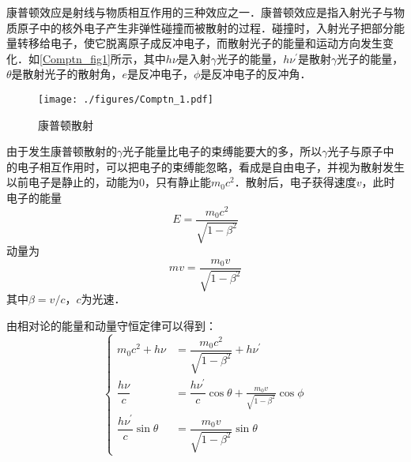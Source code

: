 
康普顿效应是射线与物质相互作用的三种效应之一．康普顿效应是指入射光子与物质原子中的核外电子产生非弹性碰撞而被散射的过程．碰撞时，入射光子把部分能量转移给电子，使它脱离原子成反冲电子，而散射光子的能量和运动方向发生变化．如\autoref{Comptn_fig1}所示，其中$h\nu$是入射$\gamma$光子的能量，$h\nu^\prime$是散射$\gamma$光子的能量，$\theta$是散射光子的散射角，$e$是反冲电子，$\phi$是反冲电子的反冲角．
\begin{figure}[ht]
\centering
\texttt{[image: ./figures/Comptn\_1.pdf]}
\caption{康普顿散射} \label{Comptn_fig1}
\end{figure}
由于发生康普顿散射的$\gamma$光子能量比电子的束缚能要大的多，所以$\gamma$光子与原子中的电子相互作用时，可以把电子的束缚能忽略，看成是自由电子，并视为散射发生以前电子是静止的，动能为$0$，只有静止能$m_0c^2$．散射后，电子获得速度$v$，此时电子的能量
\begin{equation}
E=\frac{m_{0} c^{2}}{\sqrt{1-\beta^{2}}}
\end{equation}
动量为
\begin{equation}
m v=\frac{m_{0} v}{\sqrt{1-\beta^{2}}}
\end{equation}
其中$\beta=v/c$，$c$为光速．

由相对论的能量和动量守恒定律可以得到：
\begin{equation}
\begin{cases}
m_{0} c^{2}+h \nu&=\dfrac{m_{0} c^{2}}{\sqrt{1-\beta^{2}}}+h \nu^{\prime} \\
\dfrac{h \nu}{c}&=\dfrac{h \nu^{\prime}}{c} \cos \theta+\frac{m_{0} v}{\sqrt{1-\beta^{2}}} \cos \phi \\
\dfrac{h \nu^{\prime}}{c} \sin \theta&=\dfrac{m_{0} v}{\sqrt{1-\beta^{2}}} \sin \theta
\end{cases}
\end{equation}